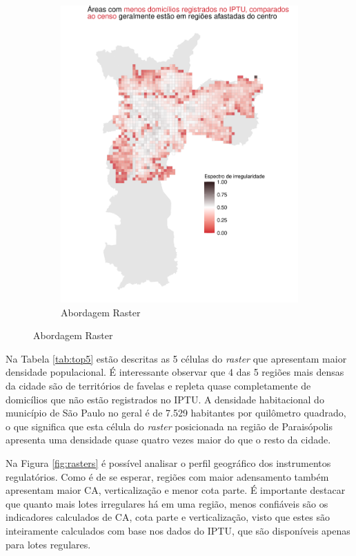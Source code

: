 \begin{figure}[h]
\begin{subfigure}[t]{0.45\linewidth}
        \includegraphics[width = \linewidth]{imagens/balanco_raster.pdf}
        \caption{Abordagem Raster}
        \label{fig:balanco-raster}
    \end{subfigure}
    \label{fig:erros-join}
\end{figure}

Na Tabela \ref{tab:top5} estão descritas as 5 células do \textit{raster} que apresentam maior densidade populacional. É interessante observar que 4 das 5 regiões mais densas da cidade são de territórios de favelas e repleta quase completamente de domicílios que não estão registrados no IPTU. A densidade habitacional do município de São Paulo no geral é de 7.529 habitantes por quilômetro quadrado, o que significa que esta célula do \textit{raster} posicionada na região de Paraisópolis apresenta uma densidade quase quatro vezes maior do que o resto da cidade.




Na Figura \ref{fig:rasters} é possível analisar o perfil geográfico dos instrumentos regulatórios. Como é de se esperar, regiões com maior adensamento também apresentam maior CA, verticalização e menor cota parte. É importante destacar que quanto mais lotes irregulares há em uma região, menos confiáveis são os indicadores calculados de CA, cota parte e verticalização, visto que estes são inteiramente calculados com base nos dados do IPTU, que são disponíveis apenas para lotes regulares.

